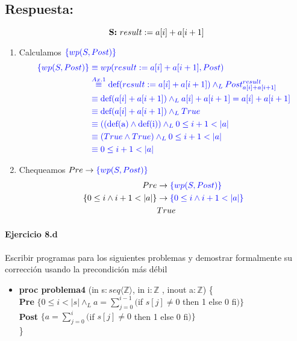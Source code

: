 \documentclass[a4paper]{article}
\begin{document}
\subsection*{Respuesta:}
$$\textbf{S:} \  result := a[i] + a[i + 1]\\$$
\begin{enumerate}

\item Calculamos $\color{blue}\{wp(S,Post)\}$
		\begin{align*}
		\color{blue}\{wp(S,Post)\}
			&\color{blue} \equiv wp(result := a[i] + a[i + 1],Post) \\
			&\color{blue} \stackrel{Ax.1}{\equiv}
			\textrm{def}(result := a[i] + a[i + 1])\wedge_L Post_{a[i]+a[i+1]}^{result} \\
			&\color{blue} \equiv \textrm{def}(a[i] + a[i + 1])
				\wedge_L a[i] + a[i + 1]=a[i] + a[i + 1] \\
			&\color{blue} \equiv \textrm{def}(a[i] + a[i + 1])
				\wedge_L True \\
			&\color{blue} \equiv ((\textrm{def(a)}\wedge
				 \textrm{def(i)})\wedge_L 0\leq i+1<|a| \\
			&\color{blue} \equiv (True \wedge
				 True)\wedge_L 0\leq i+1<|a| \\
			&\color{blue} \equiv 0\leq i+1<|a| \\	  		
		\end{align*}
\item Chequeamos $Pre \rightarrow \color{blue}\{wp(S,Post)\}$		
		\begin{align*}
		Pre &\rightarrow \color{blue}\{wp(S,Post)\}\\
		\{0 \leq i \wedge i + 1 < |a|\}&\rightarrow \color{blue}\{0\leq i \wedge i+1<|a|\}\\
		& True 
		\end{align*}
\end{enumerate}
\paragraph{Ejercicio 8.d} Escribir programas para los siguientes problemas y demostrar 
formalmente su corrección usando la precondición más débil

\begin{itemize}
\item \textbf{proc problema4 }(in s$: seq\langle \mathbb{Z}\rangle$, in i$:\mathbb{Z}$
	, inout a$: \mathbb{Z}$) \{\smallskip \\                            
    \hspace*{6mm} \textbf{Pre }$\{0 \leq i < |s| \wedge_L a=\sum_{j=0}^{i-1}($if $s[j] \neq 0$ 
    then 1 else 0 fi$)\}$\smallskip \\          
   \hspace*{6mm} \textbf{Post }$\{a=\sum_{j=0}^{i}($if $s[j] \neq 0$ 
    then 1 else 0 fi$)\}$\\
   \}     
\end{itemize}
\end{document}
